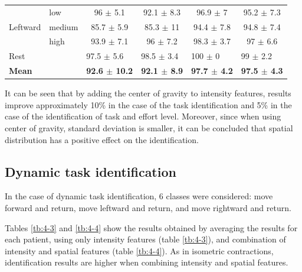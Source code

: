 \begin{table}[h!]
\begin{tabular}{llcccc}
              & low            & 96 $\pm$ 5.1                                  & 92.1 $\pm$ 8.3                               & 96.9 $\pm$ 7                                & 95.2 $\pm$ 7.3                              \\
Leftward      & medium         & 85.7 $\pm$ 5.9                                & 85.3 $\pm$ 11                                & 94.4 $\pm$ 7.8                              & 94.8 $\pm$ 7.4                              \\
              & high           & 93.9 $\pm$ 7.1                                & 96 $\pm$ 7.2                                 & 98.3 $\pm$ 3.7                              & 97 $\pm$ 6.6                                \\ \hline
Rest          &                & \multicolumn{1}{l}{97.5 $\pm$ 5.6}            & \multicolumn{1}{l}{98.5 $\pm$ 3.4}           & \multicolumn{1}{l}{100 $\pm$ 0}             & \multicolumn{1}{l}{99 $\pm$ 2.2}            \\
\textbf{Mean} & \textbf{}      & \multicolumn{1}{l}{\textbf{92.6  $\pm$ 10.2}} & \multicolumn{1}{l}{\textbf{92.1  $\pm$ 8.9}} & \multicolumn{1}{l}{\textbf{97.7 $\pm$ 4.2}} & \multicolumn{1}{l}{\textbf{97.5 $\pm$ 4.3}}
\end{tabular}
\end{table}

It can be seen that by adding the center of gravity to intensity features, results improve approximately 10\% in the case of the task identification and 5\% in the case of the identification of task and effort level. Moreover, since when using center of gravity, standard deviation is smaller, it can be concluded that spatial distribution has a positive effect on the identification.


\subsection{Dynamic task identification}
In the case of dynamic task identification, 6 classes were considered: move forward and return, move leftward and return, and move rightward and return.

Tables \ref{tb:4-3} and \ref{tb:4-4} show the results obtained by averaging the results for each patient, using only intensity features (table \ref{tb:4-3}), and combination of intensity and spatial features (table \ref{tb:4-4}). As in isometric contractions, identification results are higher when combining intensity and spatial features.


